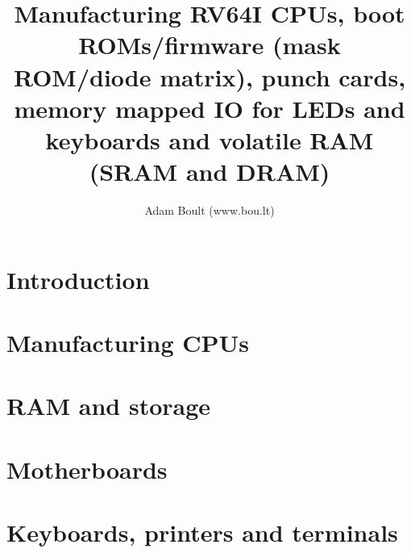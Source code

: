 \documentclass[oneside]{book}
\begin{document}
\author{Adam Boult (www.bou.lt)}
\title{Manufacturing RV64I CPUs, boot ROMs/firmware (mask ROM/diode matrix), punch cards, memory mapped IO for LEDs and keyboards and volatile RAM (SRAM and DRAM)}
\maketitle

\setcounter{tocdepth}{0}
\tableofcontents



\part{Introduction}

\part{Manufacturing CPUs}

\part{RAM and storage}

\part{Motherboards}

\part{Keyboards, printers and terminals}
\end{document}
